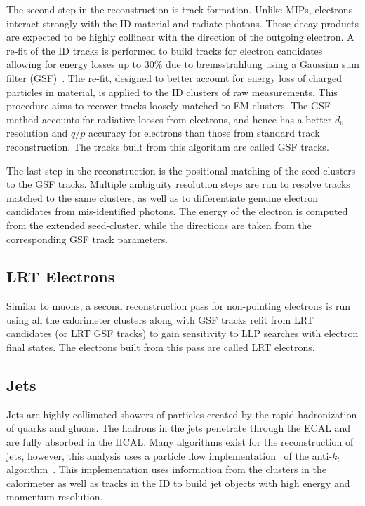 The second step in the reconstruction is track formation. Unlike MIPs, electrons interact strongly with the ID material and radiate photons. These decay products are expected to be highly collinear with the direction of the outgoing electron. A re-fit of the ID tracks is performed to build tracks for electron candidates allowing for energy losses up to 30\% due to bremsstrahlung using a Gaussian sum filter (GSF)~\cite{ATLAS-CONF-2012-047}. The re-fit, designed to better account for energy loss of charged particles in material, is applied to the ID clusters of raw measurements. This procedure aims to recover tracks loosely matched to EM clusters. The GSF method accounts for radiative looses from electrons, and hence has a better $d_0$ resolution and $q/p$ accuracy for electrons than those from standard track reconstruction. The tracks built from this algorithm are called GSF tracks.

The last step in the reconstruction is the positional matching of the seed-clusters to the GSF tracks. Multiple ambiguity resolution steps are run to resolve tracks matched to the same clusters, as well as to differentiate genuine electron candidates from mis-identified photons. The energy of the electron is computed from the extended seed-cluster, while the directions are taken from the corresponding GSF track parameters.

\subsection*{LRT Electrons}
Similar to muons, a second reconstruction pass for non-pointing electrons is run using all the calorimeter clusters along with GSF tracks refit from LRT candidates (or LRT GSF tracks) to gain sensitivity to LLP searches with electron final states. The electrons built from this pass are called LRT electrons.

\subsection{Jets}
Jets are highly collimated showers of particles created by the rapid hadronization of quarks and gluons. The hadrons in the jets penetrate through the ECAL and are fully absorbed in the HCAL. Many algorithms exist for the reconstruction of jets, however, this analysis uses a particle flow implementation~\cite{PERF-2015-09} of the anti-$k_t$ algorithm~\cite{anti-kT}. This implementation uses information from the clusters in the calorimeter as well as tracks in the ID to build jet objects with high energy and momentum resolution.

